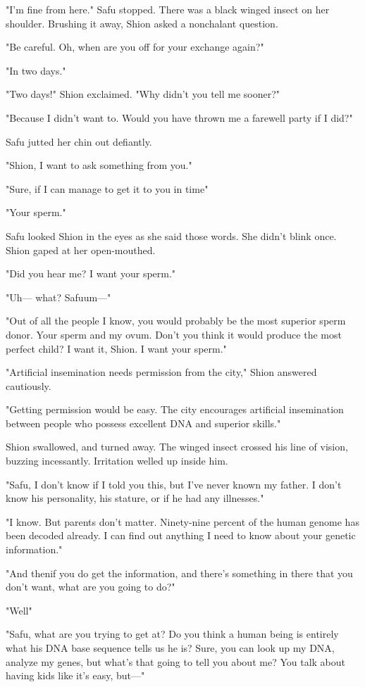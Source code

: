 "I'm fine from here." Safu stopped. There was a black winged insect on
her shoulder. Brushing it away, Shion asked a nonchalant question.

"Be careful. Oh, when are you off for your exchange again?"

"In two days."

"Two days!" Shion exclaimed. "Why didn't you tell me sooner?"

"Because I didn't want to. Would you have thrown me a farewell party if
I did?"

Safu jutted her chin out defiantly.

"Shion, I want to ask something from you."

"Sure, if I can manage to get it to you in time\el "

"Your sperm."

Safu looked Shion in the eyes as she said those words. She didn't blink
once. Shion gaped at her open-mouthed.

"Did you hear me? I want your sperm."

"Uh--- what? Safu\el um---"

"Out of all the people I know, you would probably be the most superior
sperm donor. Your sperm and my ovum. Don't you think it would produce
the most perfect child? I want it, Shion. I want your sperm."

"Artificial insemination needs permission from the city," Shion answered
cautiously.

"Getting permission would be easy. The city encourages artificial
insemination between people who possess excellent DNA and superior
skills."

Shion swallowed, and turned away. The winged insect crossed his line of
vision, buzzing incessantly. Irritation welled up inside him.

"Safu, I don't know if I told you this, but I've never known my father.
I don't know his personality, his stature, or if he had any illnesses."

"I know. But parents don't matter. Ninety-nine percent of the human
genome has been decoded already. I can find out anything I need to know
about your genetic information."

"And then\el if you do get the information, and there's something in
there that you don't want, what are you going to do?"

"Well\el "

"Safu, what are you trying to get at? Do you think a human being is
entirely what his DNA base sequence tells us he is? Sure, you can look
up my DNA, analyze my genes, but what's that going to tell you about me?
You talk about having kids like it's easy, but---"

